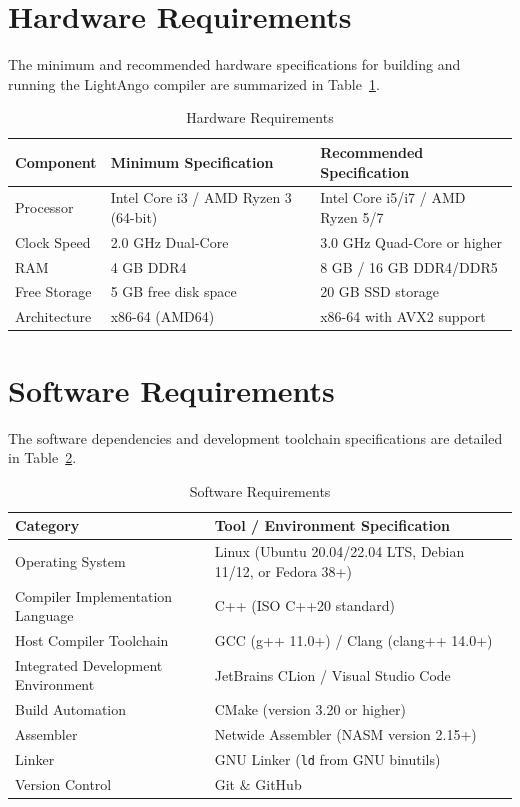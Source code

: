 \section{Hardware Requirements}
The minimum and recommended hardware specifications for building and running the LightAngo compiler are summarized in Table~\ref{tab:hardware_req}.

\begin{table}[h!]
\centering
\caption{Hardware Requirements} \label{tab:hardware_req}
\begin{tabular}{|l|l|l|}
\hline
\textbf{Component} & \textbf{Minimum Specification} & \textbf{Recommended Specification} \\
\hline
Processor & Intel Core i3 / AMD Ryzen 3 (64-bit) & Intel Core i5/i7 / AMD Ryzen 5/7 \\
Clock Speed & 2.0 GHz Dual-Core & 3.0 GHz Quad-Core or higher \\
RAM & 4 GB DDR4 & 8 GB / 16 GB DDR4/DDR5 \\
Free Storage & 5 GB free disk space & 20 GB SSD storage \\
Architecture & x86-64 (AMD64) & x86-64 with AVX2 support \\
\hline
\end{tabular}
\end{table}

\section{Software Requirements}
The software dependencies and development toolchain specifications are detailed in Table~\ref{tab:software_req}.

\begin{table}[h!]
\centering
\caption{Software Requirements} \label{tab:software_req}
\begin{tabular}{|l|l|}
\hline
\textbf{Category} & \textbf{Tool / Environment Specification} \\
\hline
Operating System & Linux (Ubuntu 20.04/22.04 LTS, Debian 11/12, or Fedora 38+) \\
Compiler Implementation Language & C++ (ISO C++20 standard) \\
Host Compiler Toolchain & GCC (g++ 11.0+) / Clang (clang++ 14.0+) \\
Integrated Development Environment & JetBrains CLion / Visual Studio Code \\
Build Automation & CMake (version 3.20 or higher) \\
Assembler & Netwide Assembler (NASM version 2.15+) \\
Linker & GNU Linker (\texttt{ld} from GNU binutils) \\
Version Control & Git \& GitHub \\
\hline
\end{tabular}
\end{table}

